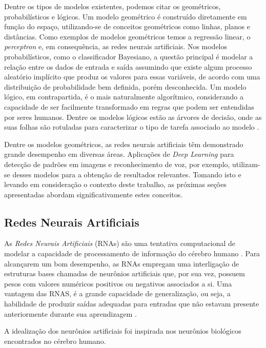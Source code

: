 Dentre os tipos de modelos existentes, podemos citar os geométricos, probabilísticos e lógicos. Um modelo geométrico é construído diretamente em função do espaço, utilizando-se de conceitos geométricos como linhas, planos e distâncias. Como exemplos de modelos geométricos temos a regressão linear, o \emph{perceptron} e, em consequência, as redes neurais artificiais. Nos modelos probabilísticos, como o classificador Bayesiano, a questão principal é modelar a relação entre os dados de entrada e saída assumindo que existe algum processo aleatório implícito que produz os valores para essas variáveis, de acordo com uma distribuição de probabilidade bem definida, porém desconhecida. Um modelo lógico, em contrapartida, é o mais naturalmente algorítmico, considerando a capacidade de ser facilmente transformado em regras que podem ser entendidas por seres humanos. Dentre os modelos lógicos estão as árvores de decisão, onde as suas folhas são rotuladas para caracterizar o tipo de tarefa associado ao modelo \cite{flach}.

Dentre os modelos geométricos, as redes neurais artificiais têm demonstrado grande desempenho em diversas áreas. Aplicações de \emph{Deep Learning} para detecção de padrões em imagens e reconhecimento de voz, por exemplo, utilizam-se desses modelos para a obtenção de resultados relevantes. Tomando isto e levando em consideração o contexto deste trabalho, as próximas seções apresentadas abordam significativamente estes conceitos.


\subsection{Redes Neurais Artificiais}
\label{subsec:rna}

As \emph{Redes Neurais Artificiais} (RNAs) são uma tentativa computacional de modelar a capacidade de processamento de informação do cérebro humano \cite{rojas}. Para alcançarem um bom desempenho, as RNAs empregam uma interligação de estruturas bases chamadas de neurônios artificiais que, por sua vez, possuem pesos com valores numéricos positivos ou negativos associados a si. Uma vantagem das RNAS, é a grande capacidade de generalização, ou seja, a habilidade de produzir saídas adequadas para entradas que não estavam presente anteriormente durante sua aprendizagem \cite{haykin}.

A idealização dos neurônios artificiais foi inspirada nos neurônios biológicos encontrados no cérebro humano.

